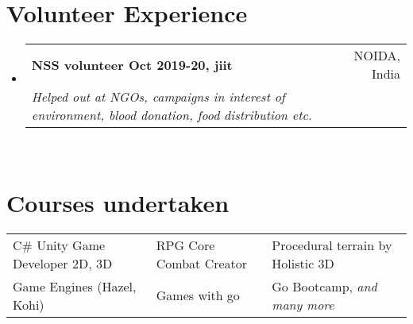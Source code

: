 \documentclass[a4paper,20pt]{article}
\makeatletter
\newcommand{\resumeSubheading}[4]{
  \vspace{-1pt}\item
    \begin{tabular*}{0.97\textwidth}{l@{\extracolsep{\fill}}r}
      \textbf{#1} & #2 \\
      \textit{#3} & \textit{#4} \\
    \end{tabular*}\vspace{-5pt}
}
\newcommand{\resumeSubHeadingListStart}{\begin{itemize}[leftmargin=*]}
\newcommand{\resumeSubHeadingListEnd}{\end{itemize}}
\makeatother
\begin{document}
\section{Volunteer Experience}
  \resumeSubHeadingListStart
    \resumeSubheading
        {NSS volunteer Oct 2019-20, jiit}{NOIDA, India}
        {Helped out at NGOs, campaigns in interest of environment, blood donation, food distribution etc. }{} \\
  \resumeSubHeadingListEnd

\section{Courses undertaken}
\begin{tabular}{p{}p{}p{}}
    {C\# Unity Game Developer 2D, 3D}&{RPG Core Combat Creator}&{Procedural terrain by Holistic 3D}\\
    {Game Engines (Hazel, Kohi)}&{Games with go}&{Go Bootcamp, \textit{and many more}}\\
\end{tabular}
\end{document}
